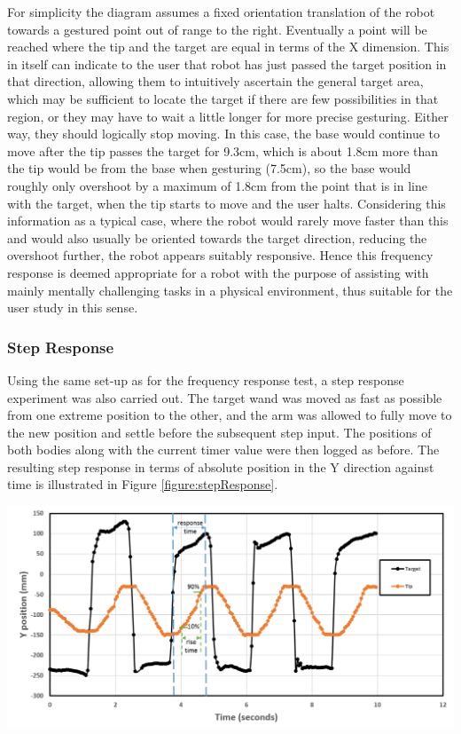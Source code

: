 \documentclass[11pt]{article}
\begin{document}
For simplicity the diagram assumes a fixed orientation translation of the robot towards a gestured point out of range to the right. Eventually a point will be reached where the tip and the target are equal in terms of the X dimension. This in itself can indicate to the user that robot has just passed the target position in that direction, allowing them to intuitively ascertain the general target area, which may be sufficient to locate the target if there are few possibilities in that region, or they may have to wait a little longer for more precise gesturing. Either way, they should logically stop moving. In this case, the base would continue to move after the tip passes the target for 9.3cm, which is about 1.8cm more than the tip would be from the base when gesturing (7.5cm), so the base would roughly only overshoot by a maximum of 1.8cm  from the point that is in line with the target, when the tip starts to move and the user halts. Considering this information as a typical case, where the robot would rarely move faster than this and would also usually be oriented towards the target direction, reducing the overshoot further, the robot appears suitably responsive. Hence this frequency response is deemed appropriate for a robot with the purpose of assisting with mainly mentally challenging tasks in a physical environment, thus suitable for the user study in this sense.



\subsubsection{Step Response}

Using the same set-up as for the frequency response test, a step response experiment was also carried out. The target wand was moved as fast as possible from one extreme position to the other, and the arm was allowed to fully move to the new position and settle before the subsequent step input. The positions of both bodies along with the current timer value were then logged as before. The resulting step response in terms of absolute position in the Y direction against time is illustrated in Figure \ref{figure:stepResponse}.

\begin{center}
\includegraphics[width=\textwidth]{images/stepResponse.png}
\label{figure:stepResponse}
\end{center}
\end{document}
